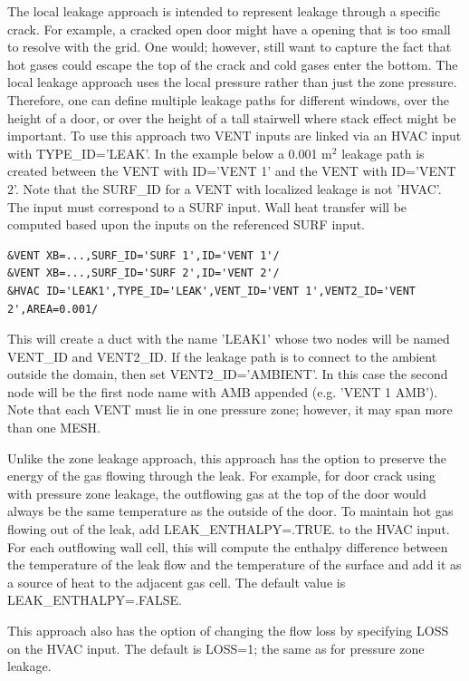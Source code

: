 \documentclass[11pt]{book}
\begin{document}
The local leakage approach is intended to represent leakage through a specific crack. For example, a cracked open door might have a opening that is too small to resolve with the grid.  One would; however, still want to capture the fact that hot gases could escape the top of the crack and cold gases enter the bottom. The local leakage approach uses the local pressure rather than just the zone pressure. Therefore, one can define multiple leakage paths for different windows, over the height of a door, or over the height of a tall stairwell where stack effect might be important. To use this approach two {\ct VENT} inputs are linked via an {\ct HVAC} input with {\ct TYPE\_ID='LEAK'}. In the example below a 0.001 m$^2$ leakage path is created between the {\ct VENT} with {\ct ID='VENT 1'} and the {\ct VENT} with {\ct ID='VENT 2'}. Note that the {\ct SURF\_ID} for a {\ct VENT} with localized leakage is not {\ct 'HVAC'}. The input must correspond to a {\ct SURF} input. Wall heat transfer will be computed based upon the inputs on the referenced {\ct SURF} input.
\begin{lstlisting}
&VENT XB=...,SURF_ID='SURF 1',ID='VENT 1'/
&VENT XB=...,SURF_ID='SURF 2',ID='VENT 2'/
&HVAC ID='LEAK1',TYPE_ID='LEAK',VENT_ID='VENT 1',VENT2_ID='VENT 2',AREA=0.001/
\end{lstlisting}
This will create a duct with the name {\ct 'LEAK1'} whose two nodes will be named {\ct VENT\_ID} and {\ct VENT2\_ID}. If the leakage path is to connect to the ambient outside the domain, then set {\ct VENT2\_ID='AMBIENT'}. In this case the second node will be the first node name with {\ct AMB} appended (e.g. {\ct 'VENT 1 AMB'}). Note that each {\ct VENT} must lie in one pressure zone; however, it may span more than one {\ct MESH}.

Unlike the zone leakage approach, this approach has the option to preserve the energy of the gas flowing through the leak. For example, for door crack using with pressure zone leakage, the outflowing gas at the top of the door would always be the same temperature as the outside of the door. To maintain hot gas flowing out of the leak, add {\ct LEAK\_ENTHALPY=.TRUE.} to the {\ct HVAC} input. For each outflowing wall cell, this will compute the enthalpy difference between the temperature of the leak flow and the temperature of the surface and add it as a source of heat to the adjacent gas cell.  The default value is {\ct LEAK\_ENTHALPY=.FALSE.}

This approach also has the option of changing the flow loss by specifying {\ct LOSS} on the {\ct HVAC} input.  The default is {\ct LOSS=1}; the same as for pressure zone leakage.
\end{document}
